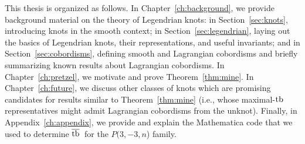 This thesis is organized as follows.
In Chapter~\ref{ch:background}, we provide background material on the theory of Legendrian knots: in Section~\ref{sec:knots}, introducing knots in the smooth context; in Section~\ref{sec:legendrian}, laying out the basics of Legendrian knots, their representations, and useful invariants; and in Section~\ref{sec:cobordisms}, defining smooth and Lagrangian cobordisms and briefly summarizing known results about Lagrangian cobordisms.
In Chapter~\ref{ch:pretzel}, we motivate and prove Theorem~\ref{thm:mine}.
In Chapter~\ref{ch:future}, we discuss other classes of knots which are promising candidates for results similar to Theorem~\ref{thm:mine} (i.e., whose maximal-$\operatorname{tb}$ representatives might admit Lagrangian cobordisms from the unknot).
Finally, in Appendix~\ref{ch:appendix}, we provide and explain the Mathematica code that we used to determine $\overline{\operatorname{tb}}\,$ for the $P(3, -3, n$) family.

